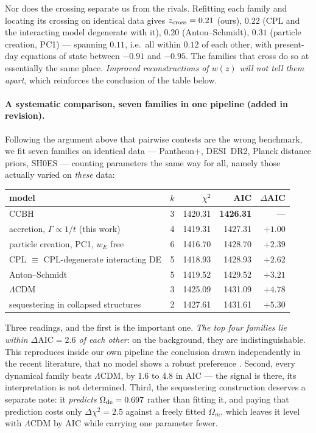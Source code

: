 \documentclass[11pt]{article}
\begin{document}
Nor does the crossing separate us from the rivals. Refitting each family and locating its crossing
on identical data gives $z_{\rm cross} = 0.21$ (ours), $0.22$ (CPL and the interacting model
degenerate with it), $0.20$ (Anton--Schmidt), $0.31$ (particle creation, PC1) --- spanning $0.11$, i.e.\ all within
$0.12$ of each other, with present-day equations of state between $-0.91$ and $-0.95$. The
families that cross do so at essentially the same place. \emph{Improved reconstructions of $w(z)$
will not tell them apart}, which reinforces the conclusion of the table below.

\paragraph{A systematic comparison, seven families in one pipeline (added in revision).}
Following the argument above that pairwise contests are the wrong benchmark, we fit seven families
on identical data --- Pantheon+, DESI~DR2, Planck distance priors, SH0ES --- counting parameters
the same way for all, namely those actually varied on \emph{these} data:
\begin{center}
\begin{tabular}{lrrrr}
\hline
model & $k$ & $\chi^2$ & AIC & $\Delta$AIC \\
\hline
CCBH \cite{Croker2024} & 3 & 1420.31 & \textbf{1426.31} & --- \\
accretion, $\Gamma \propto 1/t$ (this work) & 4 & 1419.31 & 1427.31 & $+1.00$ \\
particle creation, PC1, $w_E$ free \cite{Schiavone2026} & 6 & 1416.70 & 1428.70 & $+2.39$ \\
CPL $\equiv$ CPL-degenerate interacting DE \cite{IDE2026} & 5 & 1418.93 & 1428.93 & $+2.62$ \\
Anton--Schmidt \cite{AntonSchmidt2026} & 5 & 1419.52 & 1429.52 & $+3.21$ \\
$\Lambda$CDM & 3 & 1425.09 & 1431.09 & $+4.78$ \\
sequestering in collapsed structures \cite{Lombriser2018} & 2 & 1427.61 & 1431.61 & $+5.30$ \\
\hline
\end{tabular}
\end{center}
Three readings, and the first is the important one. \emph{The top four families lie within
$\Delta\mathrm{AIC} = 2.6$ of each other}: on the background, they are indistinguishable. This
reproduces inside our own pipeline the conclusion drawn independently in the recent literature,
that no model shows a robust preference \cite{NoGo2026}. Second, every dynamical family beats
$\Lambda$CDM, by $1.6$ to $4.8$ in AIC --- the signal is there, its interpretation is not
determined. Third, the sequestering construction deserves a separate note: it \emph{predicts}
$\Omega_{\rm de} = 0.697$ rather than fitting it, and paying that prediction costs only
$\Delta\chi^2 = 2.5$ against a freely fitted $\Omega_m$, which leaves it level with $\Lambda$CDM by
AIC while carrying one parameter fewer.
\end{document}
